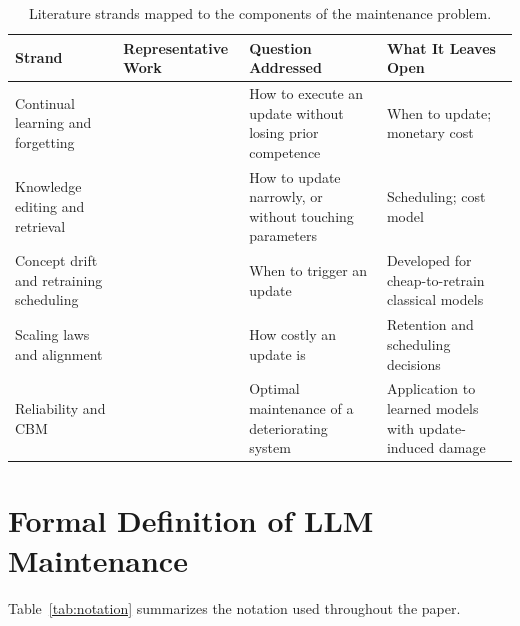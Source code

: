 \documentclass[electronics,article,submit,pdftex,moreauthors]{Definitions/mdpi}
\begin{document}
\begin{table}[H]
\caption{Literature strands mapped to the components of the maintenance problem.\label{tab:strands}}
\small
\begin{tabularx}{\textwidth}{LlLL}
\toprule
\textbf{Strand} & \textbf{Representative Work} & \textbf{Question Addressed} & \textbf{What It Leaves Open}\\
\midrule
Continual learning and forgetting & \cite{Kirkpatrick2017,Luo2023,Shi2024,Wu2024} & How to execute an update without losing prior competence & When to update; monetary cost\\
\midrule
Knowledge editing and retrieval & \cite{WangS2024,Zhang2024,Gao2023} & How to update narrowly, or without touching parameters & Scheduling; cost model\\
\midrule
Concept drift and retraining scheduling & \cite{Lu2019,Mahadevan2023,Beytur2025,Williams2026} & When to trigger an update & Developed for cheap-to-retrain classical models\\
\midrule
Scaling laws and alignment & \cite{Hoffmann2022,Kaplan2020,Ouyang2022} & How costly an update is & Retention and scheduling decisions\\
\midrule
Reliability and CBM & \cite{Pham1996,vanNoortwijk2009,Wang2002,Barlow1965} & Optimal maintenance of a deteriorating system & Application to learned models with update-induced damage\\
\bottomrule
\end{tabularx}
\end{table}

\section{Formal Definition of LLM Maintenance}\label{sec:formal}

Table~\ref{tab:notation} summarizes the notation used throughout the paper.
\end{document}
